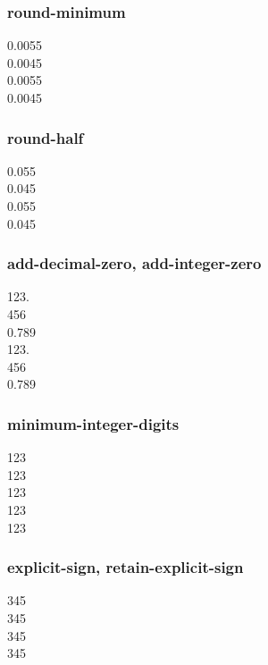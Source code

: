 \documentclass{article}
\begin{document}
\subsubsection{round-minimum}
{
%
\num{0.0055} \\
\num{0.0045} \\
%
\num{0.0055} \\
\num{0.0045}\\
}

\subsubsection{round-half}
{
%
\num{0.055} \\
\num{0.045} \\
%
\num{0.055} \\
\num{0.045}
}

\subsubsection{add-decimal-zero, add-integer-zero}
{
\num{123.} \\
\num{456} \\
\num{.789} \\
%
\num{123.} \\
\num{456} \\
\num{.789}\\
}

\subsubsection{minimum-integer-digits}
\num{123} \\
\num[minimum-integer-digits = 1]{123} \\
\num[minimum-integer-digits = 2]{123} \\
\num[minimum-integer-digits = 3]{123} \\
\num[minimum-integer-digits = 4]{123}\\

\subsubsection{explicit-sign, retain-explicit-sign}
\num{+345} \\
\num[retain-explicit-plus]{+345} \\
\num[explicit-sign = -]{345}\\
\num[explicit-sign = -]{+345}\\
\end{document}
